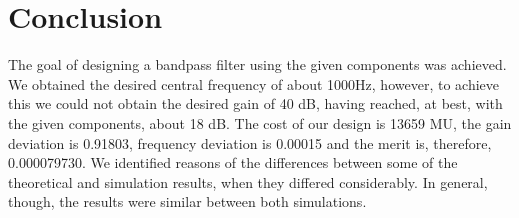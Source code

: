 \section{Conclusion}
\label{sec:conclusion}
The goal of designing a bandpass filter using the given components was achieved. We obtained the desired central frequency of about 1000Hz, however, to achieve this we could not obtain the desired gain
of 40 dB, having reached, at best, with the given components, about 18 dB. The cost of our design is 13659 MU, the gain deviation is 0.91803, frequency deviation is 0.00015 and the merit is, therefore, 0.000079730. We identified reasons of the differences
between some of the theoretical and simulation results, when they differed considerably. In general, though, the results were similar between both simulations.


